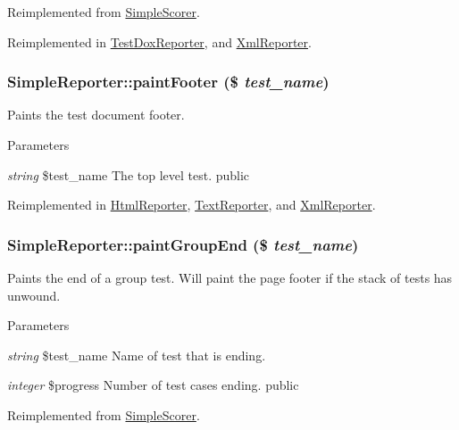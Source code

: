 Reimplemented from \hyperlink{class_simple_scorer_ae66388eacb1a7ef3f99443a942c8a9b1}{SimpleScorer}.

Reimplemented in \hyperlink{class_test_dox_reporter_a0675ceed8813548f9d1bafc71c794f24}{TestDoxReporter}, and \hyperlink{class_xml_reporter_aebd11df8a848fa3f5b2d0d1b725249c1}{XmlReporter}.\hypertarget{class_simple_reporter_a447a6e823a5c17b1bd5f922a0b18fded}{
\subsubsection[{paintFooter}]{\setlength{\rightskip}{0pt plus 5cm}SimpleReporter::paintFooter (\$ {\em test\_\-name})}}
\label{class_simple_reporter_a447a6e823a5c17b1bd5f922a0b18fded}
Paints the test document footer. 
\begin{DoxyParams}{Parameters}
\item[{\em string}]\$test\_\-name The top level test.  public  \end{DoxyParams}


Reimplemented in \hyperlink{class_html_reporter_a7397e35688d992bc2cfb17c973a980b4}{HtmlReporter}, \hyperlink{class_text_reporter_af40b27732bf32f71ad4f2ebee6417667}{TextReporter}, and \hyperlink{class_xml_reporter_a76c2686a0abdea6a07ce6437b708cc71}{XmlReporter}.\hypertarget{class_simple_reporter_a2b6b699cadeb44f4dc666f3c94ac22be}{
\subsubsection[{paintGroupEnd}]{\setlength{\rightskip}{0pt plus 5cm}SimpleReporter::paintGroupEnd (\$ {\em test\_\-name})}}
\label{class_simple_reporter_a2b6b699cadeb44f4dc666f3c94ac22be}
Paints the end of a group test. Will paint the page footer if the stack of tests has unwound. 
\begin{DoxyParams}{Parameters}
\item[{\em string}]\$test\_\-name Name of test that is ending. \item[{\em integer}]\$progress Number of test cases ending.  public \end{DoxyParams}


Reimplemented from \hyperlink{class_simple_scorer_a40b030cbba90f114374191cbed7d459d}{SimpleScorer}.

